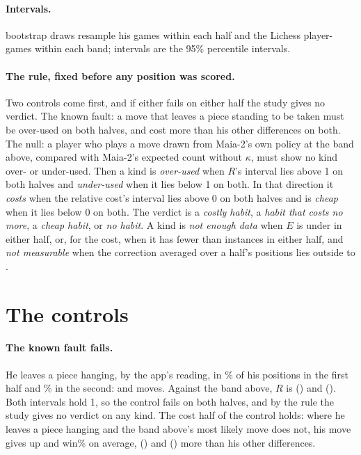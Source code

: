 \documentclass[11pt]{article}
\begin{document}
\paragraph{Intervals.} \Draws{} bootstrap draws resample his games within each half and the
Lichess player-games within each band; intervals are the 95\% percentile intervals.

\paragraph{The rule, fixed before any position was scored.} Two controls come first, and if
either fails on either half the study gives no verdict. The known fault: a move that leaves a
piece standing to be taken must be over-used on both halves, and cost more than his other
differences on both. The null: a player who plays a move drawn from Maia-2's own policy at the
band above, compared with Maia-2's expected count without $\kappa$, must show no kind over- or
under-used. Then a kind is \emph{over-used} when $R$'s interval lies above 1 on both halves and
\emph{under-used} when it lies below 1 on both. In that direction it \emph{costs} when the
relative cost's interval lies above 0 on both halves and is \emph{cheap} when it lies below 0 on
both. The verdict is a \emph{costly habit}, a \emph{habit that costs no more}, a \emph{cheap
habit}, or \emph{no habit}. A kind is \emph{not enough data} when $E$ is under \MinCount{} in
either half, or, for the cost, when it has fewer than \MinCount{} instances in either half, and
\emph{not measurable} when the correction averaged over a half's positions lies outside
\KappaLow{} to \KappaHigh.

\section{The controls}

\paragraph{The known fault fails.} He leaves a piece hanging, by the app's reading, in
\HisHangsFirst\% of his positions in the first half and \HisHangsSecond\% in the second:
\HangsNFirst{} and \HangsNSecond{} moves. Against the band above, $R$ is \HangsRFirst{}
(\HangsRFirstCi) and \HangsRSecond{} (\HangsRSecondCi). Both intervals hold 1, so the control fails
on both halves, and by the rule the study gives no verdict on any kind. The cost half of the
control holds: where he leaves a piece hanging and the band above's most likely move does not,
his move gives up \HangsOverDFirst{} and \HangsOverDSecond{} win\% on average, \HangsRelFirst{}
(\HangsRelFirstCi) and \HangsRelSecond{} (\HangsRelSecondCi) more than his other differences.
\end{document}
